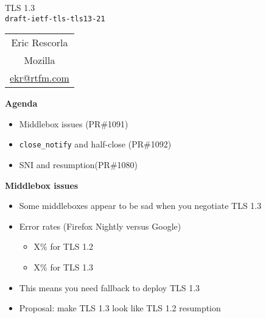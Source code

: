 \documentclass[helvetica]{seminar}
\newcommand{\heading}[1]{%
  \begin{center} 
    \large\bf 
    #1 
  \end{center} 
  \vspace{.4 in}}
\begin{document}
\begin{slide}
\begin{center}
\vspace{.5 in}
\LARGE{{\bf}TLS 1.3\\{\small \verb^draft-ietf-tls-tls13-21^}}\\
\vspace{.2in}
\large{
\begin{tabular}{c}
Eric Rescorla\\
Mozilla\\
\url{ekr@rtfm.com}
\end{tabular}
}
\end{center}
\end{slide}

\centerslidesfalse 

\begin{slide}
  \heading{Agenda}

  \begin{itemize}
  \item Middlebox issues (PR\#1091)
  \item \verb^close_notify^ and half-close (PR\#1092)
  \item SNI and resumption(PR\#1080)
  \end{itemize}
\end{slide}


\begin{slide}
  \heading{Middlebox issues}

  \begin{itemize}
  \item Some middleboxes appear to be sad when you negotiate TLS 1.3
  \item Error rates (Firefox Nightly versus Google)
    \begin{itemize}
    \item X\% for TLS 1.2
    \item X\% for TLS 1.3
    \end{itemize}
  \item This means you need fallback to deploy TLS 1.3
  \item Proposal: make TLS 1.3 look like TLS 1.2 resumption
  \end{itemize}
\end{slide}
\end{document}
